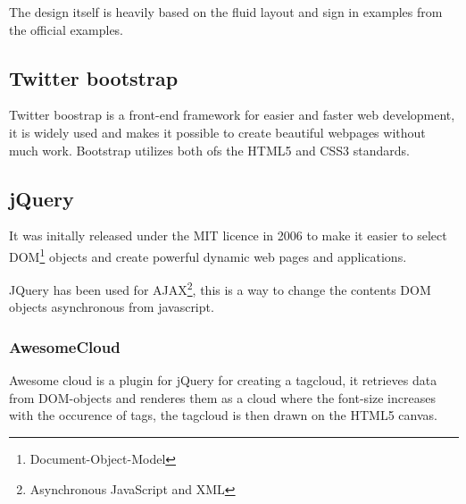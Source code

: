 The design itself is heavily based on the fluid layout and sign in examples from the official examples.

\subsection{Twitter bootstrap}
Twitter boostrap is a front-end framework for easier and faster web development, it is widely used and makes it possible to create beautiful webpages without much work. Bootstrap utilizes both ofs the HTML5 and CSS3 standards.

\subsection{jQuery}
It was initally released under the MIT licence in 2006 to make it easier to select DOM\footnote{Document-Object-Model} objects and create powerful dynamic web pages and applications.

JQuery has been used for AJAX\footnote{Asynchronous JavaScript and XML}, this is a way to change the contents DOM objects asynchronous from javascript.

\subsubsection{AwesomeCloud}
Awesome cloud is a plugin for jQuery for creating a tagcloud, it retrieves data from DOM-objects and renderes them as a cloud where the font-size increases with the occurence of tags, the tagcloud is then drawn on the HTML5 canvas.
